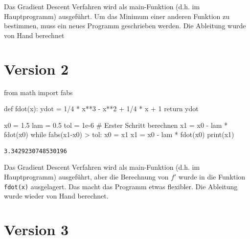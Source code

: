 \documentclass[
  a4paper,
  DIV=11]{scrreprt}
\newenvironment{Shaded}{\begin{snugshade}}{\end{snugshade}}
\newcommand{\BuiltInTok}[1]{\textcolor[rgb]{0.00,0.23,0.31}{#1}}
\newcommand{\CommentTok}[1]{\textcolor[rgb]{0.37,0.37,0.37}{#1}}
\newcommand{\ControlFlowTok}[1]{\textcolor[rgb]{0.00,0.23,0.31}{#1}}
\newcommand{\DecValTok}[1]{\textcolor[rgb]{0.68,0.00,0.00}{#1}}
\newcommand{\FloatTok}[1]{\textcolor[rgb]{0.68,0.00,0.00}{#1}}
\newcommand{\ImportTok}[1]{\textcolor[rgb]{0.00,0.46,0.62}{#1}}
\newcommand{\KeywordTok}[1]{\textcolor[rgb]{0.00,0.23,0.31}{#1}}
\newcommand{\NormalTok}[1]{\textcolor[rgb]{0.00,0.23,0.31}{#1}}
\newcommand{\OperatorTok}[1]{\textcolor[rgb]{0.37,0.37,0.37}{#1}}
\theoremstyle{definition}
\theoremstyle{definition}
\theoremstyle{remark}
\begin{document}
\begin{tcolorbox}
Das Gradient Descent Verfahren wird als main-Funktion (d.h. im
Hauptprogramm) ausgeführt. Um das Minimum einer anderen Funktion zu
bestimmen, muss ein neues Programm geschrieben werden. Die Ableitung
wurde von Hand berechnet

\section{Version 2}

\begin{Shaded}
\begin{Highlighting}[]
\ImportTok{from}\NormalTok{ math }\ImportTok{import}\NormalTok{ fabs}

\KeywordTok{def}\NormalTok{ fdot(x):}
\NormalTok{    ydot }\OperatorTok{=} \DecValTok{1}\OperatorTok{/}\DecValTok{4} \OperatorTok{*}\NormalTok{ x}\OperatorTok{**}\DecValTok{3} \OperatorTok{{-}}\NormalTok{ x}\OperatorTok{**}\DecValTok{2} \OperatorTok{+} \DecValTok{1}\OperatorTok{/}\DecValTok{4} \OperatorTok{*}\NormalTok{ x }\OperatorTok{+} \DecValTok{1}
    \ControlFlowTok{return}\NormalTok{ ydot}

\NormalTok{x0 }\OperatorTok{=} \FloatTok{1.5}
\NormalTok{lam }\OperatorTok{=} \FloatTok{0.5}
\NormalTok{tol }\OperatorTok{=} \FloatTok{1e{-}6}
\CommentTok{\# Erster Schritt berechnen}
\NormalTok{x1 }\OperatorTok{=}\NormalTok{ x0 }\OperatorTok{{-}}\NormalTok{ lam }\OperatorTok{*}\NormalTok{ fdot(x0)}
\ControlFlowTok{while}\NormalTok{ fabs(x1}\OperatorTok{{-}}\NormalTok{x0) }\OperatorTok{\textgreater{}}\NormalTok{ tol:}
\NormalTok{    x0 }\OperatorTok{=}\NormalTok{ x1}
\NormalTok{    x1 }\OperatorTok{=}\NormalTok{ x0 }\OperatorTok{{-}}\NormalTok{ lam }\OperatorTok{*}\NormalTok{ fdot(x0)}
\BuiltInTok{print}\NormalTok{(x1)}
\end{Highlighting}
\end{Shaded}

\begin{verbatim}
3.3429230748530196
\end{verbatim}

Das Gradient Descent Verfahren wird als main-Funktion (d.h. im
Hauptprogramm) ausgeführt, aber die Berechnung von \(f'\) wurde in die
Funktion \texttt{fdot(x)} ausgelagert. Das macht das Programm etwas
flexibler. Die Ableitung wurde wieder von Hand berechnet.

\section{Version 3}


\end{tcolorbox}
\end{document}
